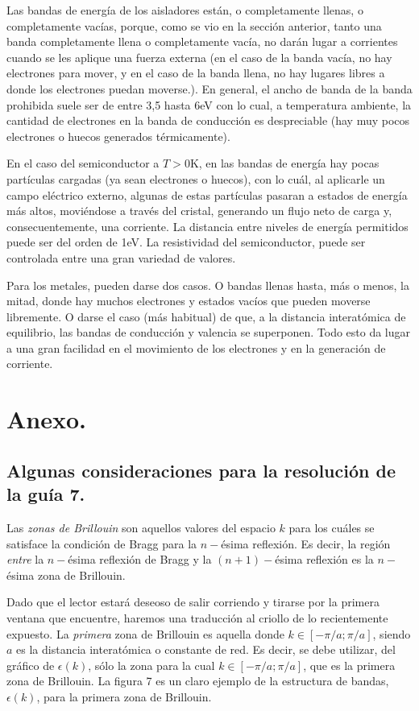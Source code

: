 \documentclass[12pt,a4paper]{article}
\begin{document}
Las bandas de energía de los aisladores están, o completamente llenas, o completamente vacías, porque, como se vio en la sección anterior, tanto una banda completamente llena o completamente vacía, no darán lugar a corrientes cuando se les aplique una fuerza externa (en el caso de la banda vacía, no hay electrones para mover, y en el caso de la banda llena, no hay lugares libres a donde los electrones puedan moverse.). En general, el ancho de banda de la banda prohibida suele ser de entre 3,5 hasta 6eV con lo cual, a temperatura ambiente, la cantidad de electrones en la banda de conducción es despreciable (hay muy pocos electrones o huecos generados térmicamente).

En el caso del semiconductor a $T>0$K, en las bandas de energía hay pocas partículas cargadas (ya sean electrones o huecos), con lo cuál, al aplicarle un campo eléctrico externo, algunas de estas partículas pasaran a estados de energía más altos, moviéndose a través del cristal, generando un flujo neto de carga y, consecuentemente, una corriente. La distancia entre niveles de energía permitidos puede ser del orden de 1eV. La resistividad del semiconductor, puede ser controlada entre una gran variedad de valores.

Para los metales, pueden darse dos casos. O bandas llenas hasta, más o menos, la mitad, donde hay muchos electrones y estados vacíos que pueden moverse libremente. O darse el caso (más habitual) de que, a la distancia interatómica de equilibrio, las bandas de conducción y valencia se superponen. Todo esto da lugar a una gran facilidad en el movimiento de los electrones y en la generación de corriente.

\section{Anexo.}

\subsection*{Algunas consideraciones para la resolución de la guía 7.}

Las \emph{zonas de Brillouin} son aquellos valores del espacio $k$ para los cuáles se satisface la condición de Bragg para la $n-$ésima reflexión. Es decir, la región \emph{entre} la $n-$ésima reflexión de Bragg y la $(n+1)-$ésima reflexión es la $n-$ésima zona de Brillouin.

Dado que el lector estará deseoso de salir corriendo y tirarse por la primera ventana que encuentre, haremos una traducción al criollo de lo recientemente expuesto. La \emph{primera} zona de Brillouin es aquella donde $k \in [-\pi/a;\pi/a]$, siendo $a$ es la distancia interatómica o constante de red. Es decir, se debe utilizar, del gráfico de $\epsilon(k)$, sólo la zona para la cual $k \in [-\pi/a;\pi/a]$, que es la primera zona de Brillouin. La figura 7 es un claro ejemplo de la estructura de bandas, $\epsilon(k)$, para la primera zona de Brillouin.
\end{document}
